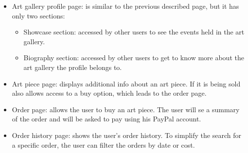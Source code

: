 \begin{itemize}
    \item Art gallery profile page: is similar to the previous described page, but it has only two sections:
    \begin{itemize}
        \item Showcase section: accessed by other users to see the events held in the art gallery.
        \item Biography section: accessed by other users to get to know more about the art gallery the profile belongs 
        to.
    \end{itemize}
    \item Art piece page: displays additional info about an art piece. If it is being sold also allows access to a buy 
    option, which leads to the order page.
    \item Order page: allows the user to buy an art piece. The user will se a summary of the order and will be asked to pay using his PayPal account.
    \item Order history page: shows the user's order history. To simplify the search for a specific order, the user can filter the orders by date or cost. 
\end{itemize}